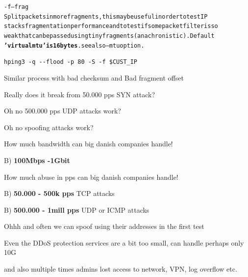 \documentclass[20pt,landscape,a4paper,footrule]{foils}
\begin{document}
\begin{alltt}\small
-f --frag
    Split  packets  in more fragments, this may be useful in order to test IP
    stacks fragmentation performance and to test if some packet filter is  so
    weak  that  can  be  passed using tiny fragments (anachronistic). Default
    {\bf 'virtual mtu' is 16 bytes}. see also --mtu option.
\end{alltt}

\begin{list1}
\item \verb+hping3 -q --flood -p 80 -S -f $CUST_IP+
\item Similar process with bad checksum and Bad fragment offset
\end{list1}



\centerline{Really does it break from 50.000 pps SYN attack?}



\centerline{Oh no 500.000 pps UDP attacks work?}


\centerline{Oh no spoofing attacks work?}





How much bandwidth can big danish companies handle!
\begin{list2}
\item B) {\bf 100Mbps -1Gbit}
\end{list2}

How much abuse in pps can big danish companies handle!
\begin{list2}
\item B) {\bf 50.000 - 500k pps} TCP attacks
\item B) {\bf 500.000 - 1mill pps} UDP or ICMP attacks
\item Ohhh and often we can spoof using their addresses in the first test
\end{list2}

Even the DDoS protection services are a bit too small, can handle perhaps only 10G

and also multiple times admins lost access to network, VPN, log overflow etc.
\end{document}
